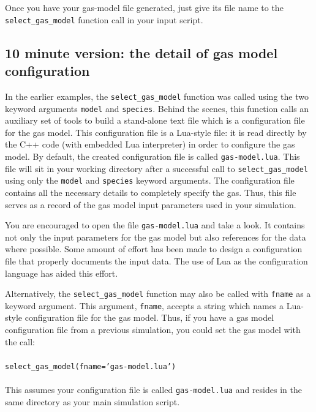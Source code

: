 \noindent
Once you have your gas-model file generated, just give its file name to 
the \texttt{select\_gas\_model} function call in your input script.

\subsection{10 minute version: the detail of gas model configuration}
In the earlier examples, the \texttt{select\_gas\_model} function was called using
the two keyword arguments \texttt{model} and \texttt{species}.
Behind the scenes, this function calls an auxiliary set of tools to build
a stand-alone text file which is a configuration file for the gas model.
This configuration file is a Lua-style file: it is read directly by the
C++ code (with embedded Lua interpreter) in order to configure the gas model.
By default, the created configuration file is called \texttt{gas-model.lua}.
This file will sit in your working directory after a successful call to
\texttt{select\_gas\_model} using only the \texttt{model} and \texttt{species} keyword
arguments.
The configuration file contains all the necessary details to completely
specify the gas.
Thus, this file serves as a record of the gas model input parameters used in
your simulation.

\medskip
You are encouraged to open the file \texttt{gas-model.lua} and take a look.
It contains not only the input parameters for the gas model but also references for the
data where possible.
Some amount of effort has been made to design a configuration file that
properly documents the input data.
The use of Lua as the configuration language has aided this effort.

\medskip
Alternatively, the \texttt{select\_gas\_model} function may also be called
with \texttt{fname} as a keyword argument.
This argument, \texttt{fname}, accepts a string which names a Lua-style configuration
file for the gas model.
Thus, if you have a gas model configuration file from a previous simulation, you could
set the gas model with the call:\\
%
\topbar\\
\texttt{select\_gas\_model(fname='gas-model.lua')}\\
\bottombar\\
%
This assumes your configuration file is called \texttt{gas-model.lua} and resides
in the same directory as your main simulation script.

